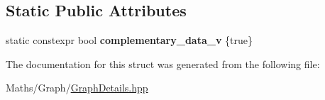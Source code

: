 \subsection*{Static Public Attributes}
\begin{DoxyCompactItemize}
\item 
\mbox{\label{structsequoia_1_1maths_1_1graph__impl_1_1edge__init__type__generator_3_01_edge_00_01graph__flavoc7f4d456a173fde3d13f1886bb621bc8_a97e6bbbdc39d11315a6419273a4567a7}} 
static constexpr bool {\bfseries complementary\+\_\+data\+\_\+v} \{true\}
\end{DoxyCompactItemize}


The documentation for this struct was generated from the following file\+:\begin{DoxyCompactItemize}
\item 
Maths/\+Graph/\mbox{\hyperlink{_graph_details_8hpp}{Graph\+Details.\+hpp}}\end{DoxyCompactItemize}
